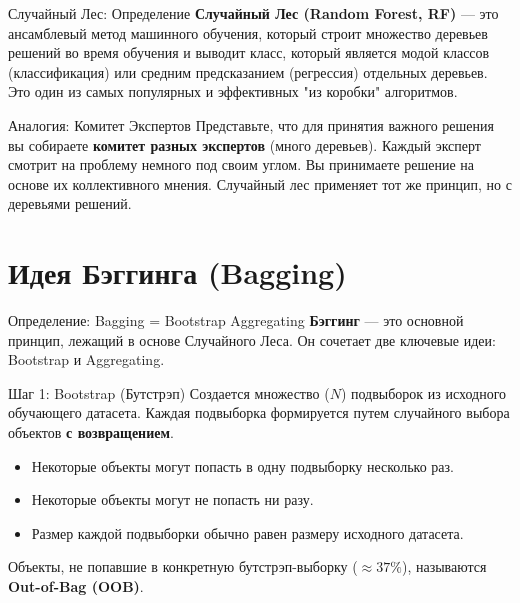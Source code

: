 
\begin{myblock}{Случайный Лес: Определение}
    \textbf{Случайный Лес (Random Forest, RF)} — это ансамблевый метод машинного обучения, который строит множество деревьев решений во время обучения и выводит класс, который является модой классов (классификация) или средним предсказанием (регрессия) отдельных деревьев. Это один из самых популярных и эффективных "из коробки" алгоритмов.
\end{myblock}

\begin{myexampleblock}{Аналогия: Комитет Экспертов}
    Представьте, что для принятия важного решения вы собираете \textbf{комитет разных экспертов} (много деревьев). Каждый эксперт смотрит на проблему немного под своим углом. Вы принимаете решение на основе их коллективного мнения. Случайный лес применяет тот же принцип, но с деревьями решений.
\end{myexampleblock}

\section{Идея Бэггинга (Bagging)}

\begin{textbox}{Определение: Bagging = Bootstrap Aggregating}
    \textbf{Бэггинг} — это основной принцип, лежащий в основе Случайного Леса. Он сочетает две ключевые идеи: Bootstrap и Aggregating.
\end{textbox}

\begin{myblock}{Шаг 1: Bootstrap (Бутстрэп)}
    Создается множество (\(N\)) подвыборок из исходного обучающего датасета. Каждая подвыборка формируется путем случайного выбора объектов \textbf{с возвращением}.
    \begin{itemize}[nosep, leftmargin=*]
        \item Некоторые объекты могут попасть в одну подвыборку несколько раз.
        \item Некоторые объекты могут не попасть ни разу.
        \item Размер каждой подвыборки обычно равен размеру исходного датасета.
    \end{itemize}
    Объекты, не попавшие в конкретную бутстрэп-выборку (\(\approx 37\%\)), называются \textbf{Out-of-Bag (OOB)}.
\end{myblock}

